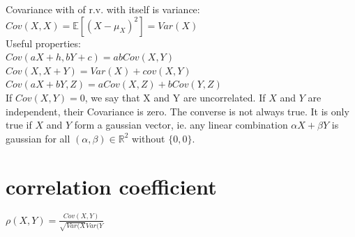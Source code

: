 Covariance with of r.v. with itself is variance:\\

$Cov(X,X) = \mathbb E[(X - \mu _ X)^2] = Var(X)$\\

Useful properties:\\

$Cov(aX + h,bY + c)= abCov(X,Y)$\\

$Cov(X,X + Y)= Var(X) + cov(X,Y)$\\

$\displaystyle  Cov(aX+ bY, Z) \displaystyle = aCov(X,Z) + bCov(Y,Z)$\\

If $Cov(X,Y) = 0$, we say that X and Y are uncorrelated. If $X$ and $Y$ are independent, their Covariance is zero. The converse is not always true. It is only true if $X$ and $Y$ form a gaussian vector, ie. any linear combination $\alpha X + \beta Y$ is gaussian for all $(\alpha,\beta) \in \mathbb{R}^2$ without $\{0,0\}$.

\section{correlation coefficient}

$\rho(X,Y) = \frac{Cov(X,Y)}{\sqrt{Var(X}Var(Y}$